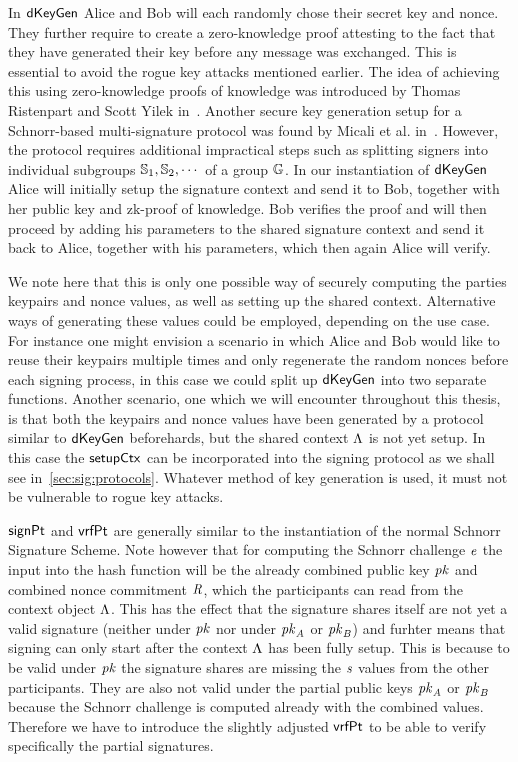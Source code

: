 In $\mathsf{dKeyGen}$ Alice and Bob will each randomly chose their secret key and nonce.
They further require to create a zero-knowledge proof attesting to the fact that they have generated their key before any message was exchanged.
This is essential to avoid the rogue key attacks mentioned earlier.
The idea of achieving this using zero-knowledge proofs of knowledge was introduced by Thomas Ristenpart and Scott Yilek in~\cite{ristenpart2007power}.
Another secure key generation setup for a Schnorr-based multi-signature protocol was found by Micali et al. in~\cite{micali2001accountable}.
However, the protocol requires additional impractical steps such as splitting signers into individual subgroups $\mathbb{S}_1, \mathbb{S}_{2}, \cdots$ of a group $\mathbb{G}$.
In our instantiation of $\mathsf{dKeyGen}$ Alice will initially setup the signature context and send it to Bob, together with her public key and zk-proof of knowledge.
Bob verifies the proof and will then proceed by adding his parameters to the shared signature context and send it back to Alice, together with his parameters, which then again Alice will verify.

We note here that this is only one possible way of securely computing the parties keypairs and nonce values, as well as setting up the shared context.
Alternative ways of generating these values could be employed, depending on the use case.
For instance one might envision a scenario in which Alice and Bob would like to reuse their keypairs multiple times and only regenerate the random nonces before each signing process, in this case we could split up $\mathsf{dKeyGen}$ into two separate functions.
Another scenario, one which we will encounter throughout this thesis, is that both the keypairs and nonce values have been generated by a protocol similar to $\mathsf{dKeyGen}$ beforehards, but the shared context $\Lambda$ is not yet setup.
In this case the $\mathsf{setupCtx}$ can be incorporated into the signing protocol as we shall see in~\cref{sec:sig:protocols}.
Whatever method of key generation is used, it must not be vulnerable to rogue key attacks.

$\mathsf{signPt}$ and $\mathsf{vrfPt}$ are generally similar to the instantiation of the normal Schnorr Signature Scheme.
Note however that for computing the Schnorr challenge $\mathit{e}$ the input into the hash function will be the already combined public key $\mathit{pk}$ and combined nonce commitment $\mathit{R}$, which the participants can read from the context object $\Lambda$.
This has the effect that the signature shares itself are not yet a valid signature (neither under $\mathit{pk}$ nor under $\mathit{pk}_{\mathit{A}}$ or $\mathit{pk}_{\mathit{B}}$) and furhter means that signing can only start after the context $\Lambda$ has been fully setup.
This is because to be valid under $\mathit{pk}$ the signature shares are missing the $\mathit{s}$ values from the other participants.
They are also not valid under the partial public keys $\mathit{pk}_{\mathit{A}}$ or $\mathit{pk}_{\mathit{B}}$ because the Schnorr challenge is computed already with the combined values.
Therefore we have to introduce the slightly adjusted $\mathsf{vrfPt}$ to be able to verify specifically the partial signatures.


